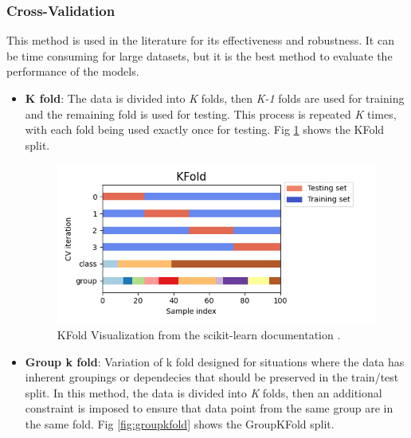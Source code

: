             \subsubsection{Cross-Validation}
                
                This method is used in the literature for its effectiveness and robustness. It can be time consuming for large datasets, but it is the best method to evaluate the performance of the models.

                \begin{itemize}

                    \item \textbf{K fold}: The data is divided into \textit{K} folds, then \textit{K-1} folds are used for training and the remaining fold is used for testing. This process is repeated \textit{K} times, with each fold being used exactly once for testing. Fig \ref{fig:kfold} shows the KFold split.
                    
                    \begin{figure}[H]
                        \centering
                        \includegraphics[width=1.0\textwidth]{../src/resources/images/other/kfold.png}
                        \caption{
                          KFold Visualization from the scikit-learn documentation \cite{Scikit Learn}.
                        }
                        \label{fig:kfold}
                    \end{figure}

                    \item \textbf{Group k fold}: Variation of k fold designed for situations where the data has inherent groupings or dependecies that should be preserved in the train/test split. In this method, the data is divided into \textit{K} folds, then an additional constraint is imposed to ensure that data point from the same group are in the same fold. Fig \ref{fig:groupkfold} shows the GroupKFold split.
                    

\end{itemize}
